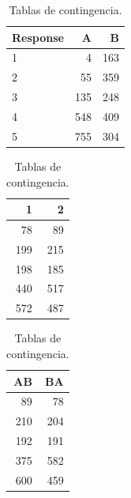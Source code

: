 \documentclass[
  12pt,
  a4paper,
  extrafontsizes,
  onecolumn,
  openright]{memoir}
\begin{document}
\begin{table}

\caption{\label{tbl-contingencia-2}Tablas de
contingencia.}\begin{minipage}[t]{0.33\linewidth}

{\centering 

\begin{tabular}[t]{lrr}
\toprule
Response & A & B\\
\midrule
1 & 4 & 163\\
2 & 55 & 359\\
3 & 135 & 248\\
4 & 548 & 409\\
5 & 755 & 304\\
\bottomrule
\end{tabular}

}

\end{minipage}%
%
\begin{minipage}[t]{0.33\linewidth}

{\centering 

\begin{tabular}[t]{rr}
\toprule
1 & 2\\
\midrule
78 & 89\\
199 & 215\\
198 & 185\\
440 & 517\\
572 & 487\\
\bottomrule
\end{tabular}

}

\end{minipage}%
%
\begin{minipage}[t]{0.33\linewidth}

{\centering 

\begin{tabular}[t]{rr}
\toprule
AB & BA\\
\midrule
89 & 78\\
210 & 204\\
192 & 191\\
375 & 582\\
600 & 459\\
\bottomrule
\end{tabular}

}

\end{minipage}%

\end{table}
\end{document}
